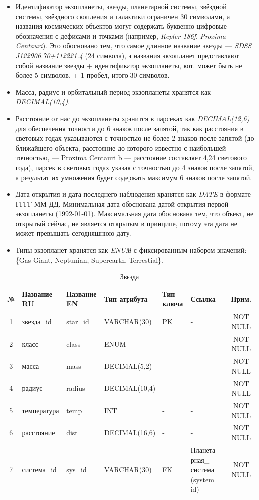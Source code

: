 \documentclass[14pt,a4paper]{extarticle}
\begin{document}
	\begin{itemize}
		\item Идентификатор экзопланеты, звезды, планетарной системы, звёздной системы, звёздного
	скопления и галактики ограничен 30 символами, а названия космических объектов
	могут содержать буквенно-цифровые обозначения с дефисами и точками (например,
	\textit{Kepler-186f}, \textit{Proxima Centauri}). Это обосновано тем, что самое длинное
	название звезды --- \textit{SDSS J122906.70+112221.4} (24 символа), а названия экзопланет представляют собой название звезды + идентификатор экзопланеты,
	кот. может быть не более 5 символов, + 1 пробел, итого 30 символов.
		\item Масса, радиус и орбитальный период экзопланеты хранятся как \textit{DECIMAL(10,4)}.
		\item Расстояние от нас до экзопланеты хранится в парсеках как \textit{DECIMAL(12,6)} для обеспечения точности до
	6 знаков после запятой, так как расстояния в световых годах указываются с точностью не более 2 знаков после запятой (до ближайшего объекта, расстояние до которого известно с наибольшей точностью, --- Proxima Centauri b --- расстояние составляет 4,24 светового года), парсек в световых годах указан с точностью до 4 знаков после запятой, а результат их умножения будет содержать максимум 6 знаков после запятой.
		\item Дата открытия и дата последнего наблюдения хранятся как \textit{DATE} в формате
	ГГГГ-ММ-ДД. Минимальная дата обоснована датой открытия первой экзопланеты (1992-01-01). Максимальная дата обоснована тем, что объект, не открытый сейчас, не является открытым в принципе, потому эта дата не может превышать сегодняшнюю дату.
		\item Типы экзопланет хранятся как \textit{ENUM} с фиксированным набором
	значений: \{Gas Giant, Neptunian, Superearth, Terrestial\}.
	\end{itemize}

	\begin{table}[H]
    \centering
    \caption{Звезда}
    \small
    \begin{tabular}{|c|p{3.2cm}|p{2.6cm}|p{2.8cm}|p{1.5cm}|p{1.5cm}|c|}
\hline
№ & Название RU & Название EN & Тип атрибута & Тип ключа & Ссылка & Прим. \\
\hline
1 & звезда\_id & star\_id & VARCHAR(30) & PK & - & NOT NULL \\
2 & класс & class & ENUM & - & - & NOT NULL \\
3 & масса & mass & DECIMAL(5,2) & - & - & NOT NULL \\
4 & радиус & radius & DECIMAL(10,4) & - & - & NOT NULL \\
5 & температура & temp & INT & - & - & NOT NULL \\
6 & расстояние & dist & DECIMAL(16,6) & - & - & NOT NULL \\
7 & система\_id & sys\_id & VARCHAR(30) & FK & Планета рная\_ система (system\_ id) & NOT NULL \\
\hline
\end{tabular}
\end{table}
\end{document}
